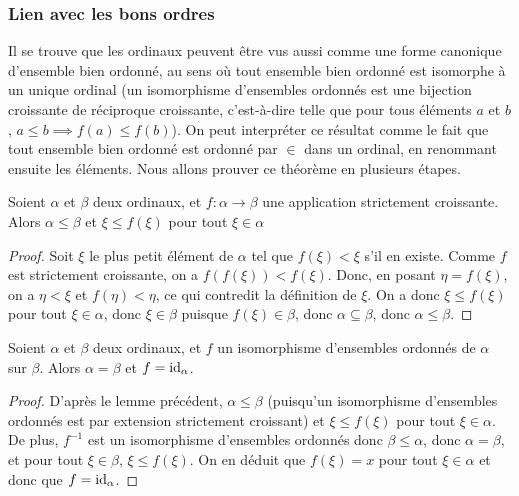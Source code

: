 \subsubsection{Lien avec les bons ordres}

Il se trouve que les ordinaux peuvent être vus aussi comme une forme canonique d'ensemble bien ordonné, au sens où tout ensemble bien ordonné est isomorphe à un unique ordinal (un isomorphisme d'ensembles ordonnés est une bijection croissante de réciproque croissante, c'est-à-dire telle que pour tous éléments $a$ et $b$, $a \leq b \implies f(a) \leq f(b)$). On peut interpréter ce résultat comme le fait que tout ensemble bien ordonné est ordonné par $\in$ dans un ordinal, en renommant ensuite les éléments. Nous allons prouver ce théorème en plusieurs étapes.

\begin{lem}
    Soient $\alpha$ et $\beta$ deux ordinaux, et $f : \alpha \to \beta$ une application strictement croissante. Alors $\alpha \leq \beta$ et $\xi \leq f(\xi)$ pour tout $\xi \in \alpha$
\end{lem}

\begin{proof}
    Soit $\xi$ le plus petit élément de $\alpha$ tel que $f(\xi) < \xi$ s'il en existe. Comme $f$ est strictement croissante, on a $f(f(\xi)) < f(\xi)$. Donc, en posant $\eta = f(\xi)$, on a $\eta < \xi$ et $f(\eta) < \eta$, ce qui contredit la définition de $\xi$. On a donc $\xi\leq f(\xi)$ pour tout $\xi \in \alpha$, donc $\xi\in\beta$ puisque $f(\xi)\in \beta$, donc $\alpha\subseteq \beta$, donc $\alpha\leq \beta$.
\end{proof}

\begin{prop}
    Soient $\alpha$ et $\beta$ deux ordinaux, et $f$ un isomorphisme d'ensembles ordonnés de $\alpha$ sur $\beta$. Alors $\alpha = \beta$ et $f = \mathrm{id}_\alpha$.
\end{prop}

\begin{proof}
    D'après le lemme précédent, $\alpha \leq \beta$ (puisqu'un isomorphisme d'ensembles ordonnés est par extension strictement croissant) et $\xi \leq f(\xi)$ pour tout $\xi \in \alpha$. De plus, $f^{-1}$ est un isomorphisme d'ensembles ordonnés donc $\beta \leq \alpha$, donc $\alpha = \beta$, et pour tout $\xi \in \beta$, $\xi \leq f(\xi)$. On en déduit que $f(\xi) = x$ pour tout $\xi\in\alpha$ et donc que $f = \mathrm{id}_\alpha$.
\end{proof}


